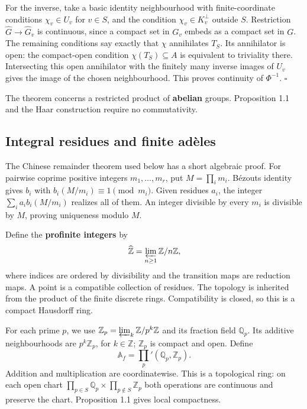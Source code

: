 \documentclass[
  english,
  11pt,
  a4paper,
]{article}
\begin{document}
For the inverse, take a basic identity neighbourhood with
finite-coordinate conditions \(\chi_v\in U_v\) for \(v\in S\), and the
condition \(\chi_v\in K_v^\perp\) outside \(S\). Restriction
\(\widehat G\to\widehat G_v\) is continuous, since a compact set in
\(G_v\) embeds as a compact set in \(G\). The remaining conditions say
exactly that \(\chi\) annihilates \(T_S\). Its annihilator is open: the
compact-open condition \(\chi(T_S)\subseteq A\) is equivalent to
triviality there. Intersecting this open annihilator with the finitely
many inverse images of \(U_v\) gives the image of the chosen
neighbourhood. This proves continuity of \(\Phi^{-1}\). \(\square\)

The theorem concerns a restricted product of \textbf{abelian} groups.
Proposition 1.1 and the Haar construction require no commutativity.

\subsection{Integral residues and finite
adèles}\label{NT-ADL-01--integral-residues-and-finite-aduxe8les}

The Chinese remainder theorem used below has a short algebraic proof.
For pairwise coprime positive integers \(m_1,\ldots,m_r\), put
\(M=\prod_i m_i\). Bézout\textquotesingle s identity gives \(b_i\) with
\(b_i(M/m_i)\equiv1\pmod{m_i}\). Given residues \(a_i\), the integer
\(\sum_i a_i b_i(M/m_i)\) realizes all of them. An integer divisible by
every \(m_i\) is divisible by \(M\), proving uniqueness modulo \(M\).

Define the \textbf{profinite integers} by
\[\widehat{\mathbb Z}=\varprojlim_{n\geq1}\mathbb Z/n\mathbb Z,\] where
indices are ordered by divisibility and the transition maps are
reduction maps. A point is a compatible collection of residues. The
topology is inherited from the product of the finite discrete rings.
Compatibility is closed, so this is a compact Hausdorff ring.

For each prime \(p\), we use
\(\mathbb Z_p=\varprojlim_k\mathbb Z/p^k\mathbb Z\) and its fraction
field \(\mathbb Q_p\). Its additive neighbourhoods are
\(p^k\mathbb Z_p\), for \(k\in\mathbb Z\); \(\mathbb Z_p\) is compact
and open. Define \[\mathbb A_f=\prod_p'(\mathbb Q_p,\mathbb Z_p).\]
Addition and multiplication are coordinatewise. This is a topological
ring: on each open chart
\(\prod_{p\in S}\mathbb Q_p\times\prod_{p\notin S}\mathbb Z_p\) both
operations are continuous and preserve the chart. Proposition 1.1 gives
local compactness.
\end{document}
